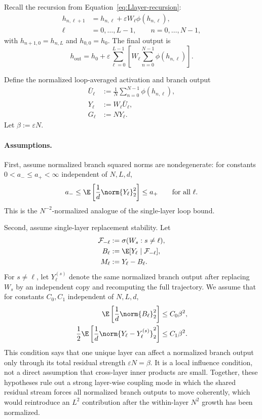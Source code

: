 Recall the recursion from Equation~\eqref{eq:Llayer-recursion}:
\[
  \begin{aligned}
  h_{n,\ell+1}
  &= h_{n,\ell}+\varepsilon W_\ell\phi(h_{n,\ell}),\\
  \ell&=0,\dots,L-1,\qquad n=0,\dots,N-1,
  \end{aligned}
\]
with $h_{n+1,0} = h_{n,L}$ and $h_{0,0} = h_0$. The final output is
\[
  h_{\text{out}}
  =
  h_0+\varepsilon\sum_{\ell=0}^{L-1}
  \left[
    W_\ell\sum_{n=0}^{N-1}\phi(h_{n,\ell})
  \right].
\]

Define the normalized loop-averaged activation and branch output
\[
  \begin{aligned}
  \bar U_\ell &:= \frac{1}{N}\sum_{n=0}^{N-1}\phi(h_{n,\ell}),\\
  Y_\ell &:= W_\ell \bar U_\ell,\\
  G_\ell &:= N Y_\ell.
  \end{aligned}
\]
Let $\beta:=\varepsilon N$.

\paragraph{Assumptions.}
First, assume normalized branch squared norms are nondegenerate: for constants $0<a_-\le a_+<\infty$ independent of $N,L,d$,
\begin{equation}
  a_-
  \le
  \E\left[\frac{1}{d}\norm{Y_\ell}_2^2\right]
  \le
  a_+
  \qquad \text{for all }\ell.
  \label{eq:app-branch-energy}
\end{equation}
This is the $N^{-2}$-normalized analogue of the single-layer loop bound.

Second, assume single-layer replacement stability. Let
\[
  \begin{aligned}
  \mathcal F_{-\ell}&:=\sigma(W_s:s\ne \ell),\\
  B_\ell&:=\E[Y_\ell\mid \mathcal F_{-\ell}],\\
  M_\ell&:=Y_\ell-B_\ell.
  \end{aligned}
\]
For $s\ne\ell$, let $Y_\ell^{(s)}$ denote the same normalized branch output after replacing $W_s$ by an independent copy and recomputing the full trajectory. We assume that for constants $C_0,C_1$ independent of $N,L,d$,
\begin{align}
  \E\left[\frac{1}{d}\norm{B_\ell}_2^2\right]
  &\le C_0\beta^2,
  \label{eq:app-drift-assumption}\\
  \frac{1}{2}\E\left[\frac{1}{d}\norm{Y_\ell-Y_\ell^{(s)}}_2^2\right]
  &\le C_1\beta^2.
  \label{eq:app-replacement-assumption}
\end{align}
This condition says that one unique layer can affect a normalized branch output only through its total residual strength $\varepsilon N=\beta$. It is a local influence condition, not a direct assumption that cross-layer inner products are small.
Together, these hypotheses rule out a strong layer-wise coupling mode in which the shared residual stream forces all normalized branch outputs to move coherently, which would reintroduce an $L^2$ contribution after the within-layer $N^2$ growth has been normalized.

